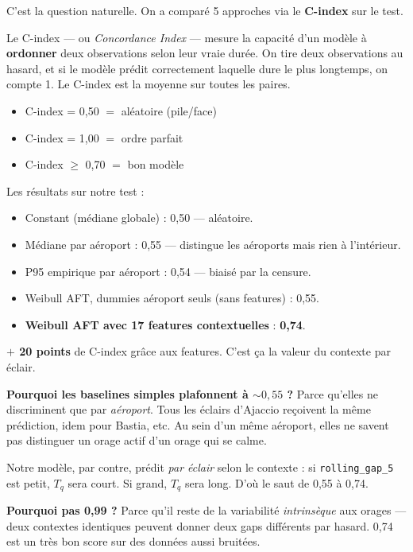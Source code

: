 \documentclass[11pt,a4paper]{article}
\begin{document}
\begin{dire}
\og C'est la question naturelle. On a comparé 5 approches via le \textbf{C-index} sur le
test.

Le C-index — ou \emph{Concordance Index} — mesure la capacité d'un modèle à \textbf{ordonner}
deux observations selon leur vraie durée. On tire deux observations au hasard, et si le
modèle prédit correctement laquelle dure le plus longtemps, on compte 1. Le C-index est
la moyenne sur toutes les paires.
\begin{itemize}[topsep=2pt]
    \item C-index = 0,50 $=$ aléatoire (pile/face)
    \item C-index = 1,00 $=$ ordre parfait
    \item C-index $\geq$ 0,70 $=$ bon modèle
\end{itemize}

Les résultats sur notre test :
\begin{itemize}[topsep=2pt]
    \item Constant (médiane globale) : 0,50 — aléatoire.
    \item Médiane par aéroport : 0,55 — distingue les aéroports mais rien à l'intérieur.
    \item P95 empirique par aéroport : 0,54 — biaisé par la censure.
    \item Weibull AFT, dummies aéroport seuls (sans features) : 0,55.
    \item \textbf{Weibull AFT avec 17 features contextuelles} : \textbf{0,74}.
\end{itemize}

\textbf{$+$ 20 points} de C-index grâce aux features. C'est ça la valeur du contexte
par éclair. \fg{}
\end{dire}

\begin{compr}
\textbf{Pourquoi les baselines simples plafonnent à $\sim 0{,}55$ ?} Parce qu'elles ne
discriminent que par \emph{aéroport}. Tous les éclairs d'Ajaccio reçoivent la même
prédiction, idem pour Bastia, etc. Au sein d'un même aéroport, elles ne savent pas
distinguer un orage actif d'un orage qui se calme.

Notre modèle, par contre, prédit \emph{par éclair} selon le contexte : si
\texttt{rolling\_gap\_5} est petit, $T_q$ sera court. Si grand, $T_q$ sera long.
D'où le saut de 0,55 à 0,74.

\textbf{Pourquoi pas 0,99 ?} Parce qu'il reste de la variabilité \emph{intrinsèque} aux
orages — deux contextes identiques peuvent donner deux gaps différents par hasard.
0,74 est un très bon score sur des données aussi bruitées.
\end{compr}
\end{document}
